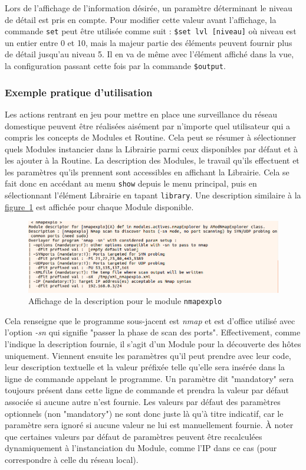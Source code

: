 \documentclass[]{article}
\newcommand{\wordlink}[2]{\hyperref[#1]{#2~\ref{#1}}}
\begin{document}
\par Lors de l'affichage de l'information désirée, un paramètre déterminant le niveau de détail est pris en compte. Pour modifier cette valeur avant l'affichage, la commande \texttt{set} peut être utilisée comme suit : \texttt{\$set lvl [niveau]} où niveau est un entier entre 0 et 10, mais la majeur partie des éléments peuvent fournir plus de détail jusqu'au niveau 5. Il en va de même avec l'élément affiché dans la vue, la configuration passant cette fois par la commande \texttt{\$output}.

\subsubsection{Exemple pratique d'utilisation}

Les actions rentrant en jeu pour mettre en place une surveillance du réseau domestique peuvent être réalisées aisément par n'importe quel utilisateur qui a compris les concepts de Modules et Routine. Cela peut se résumer à sélectionner quels Modules instancier dans la Librairie parmi ceux disponibles par défaut et à les ajouter à la Routine. La description des Modules, le travail qu'ils effectuent et les paramètres qu'ils prennent sont accessibles en affichant la Librairie. Cela se fait donc en accédant au menu \texttt{show} depuis le menu principal, puis en sélectionnant l'élément Librairie en tapant \texttt{library}. Une description similaire à la \wordlink{showlib}{figure} est affichée pour chaque Module disponible.

\begin{figure}[!ht]
\centering
     \includegraphics[width=0.9\linewidth]{showlib}
     \caption{Affichage de la description pour le module \texttt{nmapexplo}}
     \label{showlib}
\end{figure}

Cela renseigne que le programme sous-jacent est \textit{nmap} et est d'office utilisé avec l'option \textit{-sn} qui signifie "passer la phase de scan des ports". Effectivement, comme l'indique la description fournie, il s'agit d'un Module pour la découverte des hôtes uniquement. Viennent ensuite les paramètres qu'il peut prendre avec leur code, leur description textuelle et la valeur préfixée telle qu'elle sera insérée dans la ligne de commande appelant le programme. Un paramètre dit "mandatory" sera toujours présent dans cette ligne de commande et prendra la valeur par défaut associée si aucune autre n'est fournie. Les valeurs par défaut des paramètres optionnels (non "mandatory") ne sont donc juste là qu'à titre indicatif, car le paramètre sera ignoré si aucune valeur ne lui est manuellement fournie. À noter que certaines valeurs par défaut de paramètres peuvent être recalculées dynamiquement à l’instanciation du Module, comme l'IP dans ce cas (pour correspondre à celle du réseau local).\\
\end{document}
